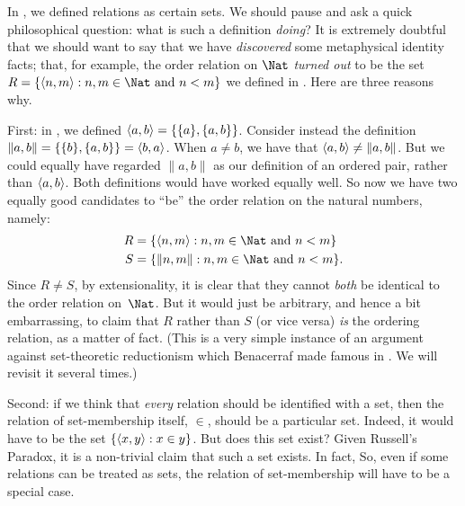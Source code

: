 \documentclass[../../../include/open-logic-section]{subfiles}
\begin{document}

In , we defined relations as certain sets. We should
pause and ask a quick philosophical question: what is such a
definition \emph{doing}? It is extremely doubtful that we should want
to say that we have \emph{discovered} some metaphysical identity
facts; that, for example, the order relation on $\Nat$ \emph{turned
out} to be the set $R=  \Setabs{\tuple{n,m}}{n, m \in \Nat\text{ and }
n < m}$ we defined in . Here are three
reasons why. 

First: in , we defined $\langle a, b \rangle =
\{\{a\}, \{a, b\}\}$. Consider instead the definition $\lVert a,
b\rVert = \{\{b\}, \{a, b\}\} = \langle b,a \rangle$. When $a \neq b$, we have
that $\langle a, b \rangle \neq \lVert a,b\rVert$. But we could equally have
regarded $\lVert a,b\rVert$ as our definition of an ordered pair,
rather than $\langle a,b \rangle$. Both definitions would have worked equally
well. So now we have two equally good candidates to ``be'' the order
relation on the natural numbers, namely:
\begin{align*}
		R &= \Setabs{\tuple{n,m}}{n, m \in \Nat \text{ and }n < m}\\
		S &= \Setabs{\lVert n,m\rVert}{n, m \in \Nat \text{ and }n < m}.
\end{align*}
Since $R \neq S$, by extensionality, it is clear that they cannot
\emph{both} be identical to the order relation on~$\Nat$. But it would
just be arbitrary, and hence a bit embarrassing, to claim that $R$
rather than $S$ (or vice versa) \emph{is} the ordering relation, as a
matter of fact. (This is a very simple instance of an argument against
set-theoretic reductionism which Benacerraf made famous in
\citeyear{Benacerraf1965}. We will revisit it several times.)

Second: if we think that \emph{every} relation should be identified
with a set, then the relation of set-membership itself, $\in$, should
be a particular set. Indeed, it would have to be the set
$\{ \langle x,y \rangle : x \in y \}$. But does this set exist? Given
Russell's Paradox, it is a non-trivial claim that such a set exists.
In fact, 
So, even if some relations can be treated as sets, the relation of
set-membership will have to be a special case.
\end{document}

